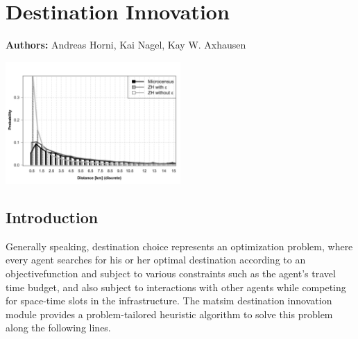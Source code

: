 \chapter{Destination Innovation}
\label{ch:destinationchoice}
\hfill \textbf{Authors:} Andreas Horni, Kai Nagel, Kay W. Axhausen

\begin{center} \includegraphics[width=0.5\textwidth, angle=0]{extending/figures/dc/zhLeisure.pdf} \end{center}


\section{Introduction}
%
Generally speaking, destination choice represents an optimization problem, where every agent searches for his or her optimal destination according to an \gls{objectivefunction} and subject to various constraints such as the agent's travel time budget, and also subject to interactions with other agents while competing for space-time slots in the infrastructure. The \gls{matsim} destination innovation module provides a problem-tailored heuristic algorithm to solve this problem along the following lines.

